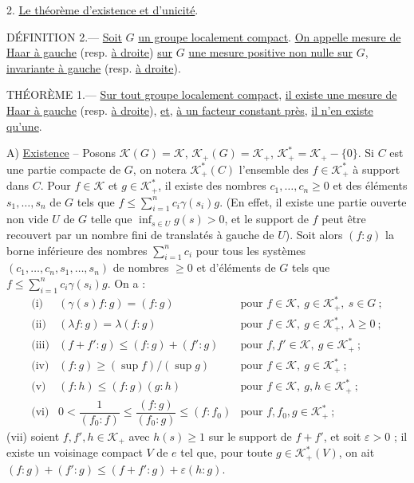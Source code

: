2. \uline{Le théorème d'existence et d'unicité}.

DÉFINITION 2.--- \uline{Soit} $G$ \uline{un groupe localement compact}. \uline{On appelle mesure de Haar à gauche} (resp. \uline{à droite}) \uline{sur} $G$ \uline{une mesure positive non nulle sur} $G$, \uline{invariante à gauche} (resp. \uline{à droite}).

THÉORÈME 1.--- \uline{Sur tout groupe localement compact}, \uline{il existe une mesure de Haar à gauche} (resp. \uline{à droite}), \uline{et}, \uline{à un facteur constant près}, \uline{il n'en existe qu'une}.

A) \uline{Existence} -- Posons $\mathcal K(G)=\mathcal K$, $\mathcal K_+(G)=\mathcal K_+$, $\mathcal K^*_+=\mathcal K_+-\{0\}$. Si $C$ est une partie compacte de $G$, on notera $\mathcal K^*_+(C)$ l'ensemble des $f\in\mathcal K^*_+$ à support dans $C$. Pour $f\in\mathcal K$ et $g\in\mathcal K^*_+$, il existe des nombres $c_1,\ldots,c_n\geq0$ et des éléments $s_1,\ldots,s_n$ de $G$ tels que $f\leq\sum_{i=1}^n c_i\gamma(s_i)g$. (En effet, il existe une partie ouverte non vide $U$ de $G$ telle que $\inf_{s\in U}g(s)>0$, et le support de $f$ peut être recouvert par un nombre fini de translatés à gauche de $U$). Soit alors $(f:g)$ la borne inférieure des nombres $\sum_{i=1}^n c_i$ pour tous les systèmes $(c_1,\ldots,c_n,s_1,\ldots,s_n)$ de nombres $\geq0$ et d'éléments de $G$ tels que $f\leq\sum_{i=1}^n c_i\gamma(s_i)g$. On a :
\[
\begin{array}{lll}
\text{(i)}&(\gamma(s)f:g)=(f:g)&\text{pour }f\in\mathcal K,\ g\in\mathcal K^*_+,\ s\in G\ ;\\
\text{(ii)}&(\lambda f:g)=\lambda(f:g)&\text{pour }f\in\mathcal K,\ g\in\mathcal K^*_+,\ \lambda\geq0\ ;\\
\text{(iii)}&(f+f':g)\leq(f:g)+(f':g)&\text{pour }f,f'\in\mathcal K,\ g\in\mathcal K^*_+\ ;\\
\text{(iv)}&(f:g)\geq(\sup f)/(\sup g)&\text{pour }f\in\mathcal K,\ g\in\mathcal K^*_+\ ;\\
\text{(v)}&(f:h)\leq(f:g)(g:h)&\text{pour }f\in\mathcal K,\ g,h\in\mathcal K^*_+\ ;\\
\text{(vi)}&0<\dfrac1{(f_0:f)}\leq\dfrac{(f:g)}{(f_0:g)}\leq(f:f_0)&\text{pour }f,f_0,g\in\mathcal K^*_+\ ;
\end{array}
\]
(vii) soient $f,f',h\in\mathcal K_+$ avec $h(s)\geq1$ sur le support de $f+f'$, et soit $\varepsilon>0$ ; il existe un voisinage compact $V$ de $e$ tel que, pour toute $g\in\mathcal K^*_+(V)$, on ait $(f:g)+(f':g)\leq(f+f':g)+\varepsilon(h:g)$.

